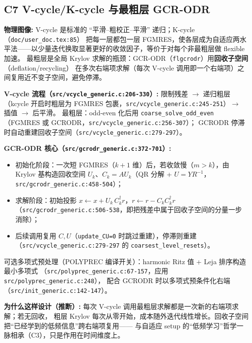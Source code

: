 \documentclass[UTF8]{ctexart}
\begin{document}
\subsection{C7 V-cycle/K-cycle 与最粗层 GCR-ODR}
\begin{physbox}
\textbf{物理图像:} V-cycle 是标准的 ``平滑--粗校正--平滑'' 递归；K-cycle（\texttt{\nolinkurl{doc/user_doc.tex:85}}）
把每一层都包一层 FGMRES，使各层成为自适应两水平法——以少量迭代换取显著更好的收敛因子，等价于对每个非最粗层做 flexible 加速。
最粗层是全局 Krylov 求解的瓶颈：GCR-ODR（\texttt{flgcrodr}）用\textbf{回收子空间}（deflation/recycling）
在多次右端项求解（每次 V-cycle 调用即一个右端项）之间复用近不变子空间，避免停滞。
\end{physbox}

\textbf{V-cycle 流程（\texttt{\nolinkurl{src/vcycle_generic.c:206-330}}）:} 限制残差 $\to$ 递归粗层
（kcycle 开启时粗层为 FGMRES 包裹，\texttt{\nolinkurl{src/vcycle_generic.c:245-251}}）$\to$ 插值 $\to$ 后平滑。
最粗层：odd-even 化后用 \texttt{coarse\_solve\_odd\_even}（FGMRES 或 GCRODR，\texttt{\nolinkurl{src/vcycle_generic.c:256-307}}）；
GCRODR 停滞时自动重建回收子空间（\texttt{\nolinkurl{src/vcycle_generic.c:279-297}}）。

\textbf{GCR-ODR 核心（\texttt{\nolinkurl{src/gcrodr_generic.c:372-701}}）:}
\begin{itemize}
\item 初始化阶段：一次短 FGMRES（$k+1$ 维）后，若收敛慢（$m>k$），由 Krylov 基构造回收空间
      $U_k$、$C_k=AU_k$（QR 分解 + $U=YR^{-1}$，\texttt{\nolinkurl{src/gcrodr_generic.c:458-504}}）；
\item 求解阶段：\textcolor{phys}{初始投影} $x \leftarrow x + U_k\,C_k^\dagger r$，$r \leftarrow r - C_k C_k^\dagger r$
      （\texttt{\nolinkurl{src/gcrodr_generic.c:506-538}}，即把残差中属于回收子空间的分量一步消除）；
\item 后续调用复用 $C,U$（\texttt{update\_CU=0} 时跳过重建），停滞则重建
      （\texttt{\nolinkurl{src/vcycle_generic.c:279-297}} 的 \texttt{coarsest\_level\_resets}）。
\end{itemize}
可选多项式预处理（POLYPREC 编译开关）：harmonic Ritz 值 + Leja 排序构造最小多项式
（\texttt{\nolinkurl{src/polyprec_generic.c:67-157}}，应用 \texttt{\nolinkurl{src/polyprec_generic.c:248}}），
配合 GCRODR 时以多项式预条件化右端（\texttt{\nolinkurl{src/init_generic.c:142-147}}）。

\begin{keybox}
\textbf{为什么这样设计（推断）:} 每次 V-cycle 调用最粗层求解都是一次新的右端项求解；若无回收，
粗层 Krylov 每次从零开始，成本随外迭代线性增长。回收子空间把``已经学到的低频信息''跨右端项复用——
与自适应 setup 的``低频学习''哲学一脉相承（C3），只是作用在时间维度上。
\end{keybox}
\end{document}
